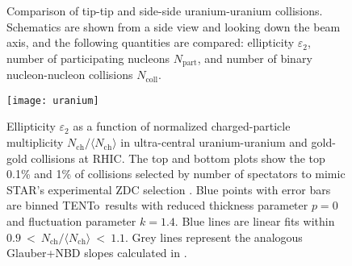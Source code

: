 \documentclass[aps,prc,reprint,amsmath,nofootinbib]{revtex4-1}
\newcommand{\trento}{T\raisebox{-.5ex}{R}ENTo}
\newcommand{\nch}{N_\text{ch}}
\begin{document}
\begin{figure}[b]
  \caption{
    \label{fig:uu-schematic}
    Comparison of tip-tip and side-side uranium-uranium collisions.
    Schematics are shown from a side view and looking down the beam axis, and the following quantities are compared:
    ellipticity $\varepsilon_2$, number of participating nucleons $N_\text{part}$, and number of binary nucleon-nucleon collisions $N_\text{coll}$.
  }
\end{figure}

\begin{figure}[b!]
  \centering
  \texttt{[image: uranium]}
  \caption{
    \label{fig:uranium}
    Ellipticity $\varepsilon_2$ as a function of normalized charged-particle multiplicity $\nch/\langle\nch\rangle$ in ultra-central uranium-uranium and gold-gold collisions at RHIC.
    The top and bottom plots show the top 0.1\% and 1\% of collisions selected by number of spectators to mimic STAR's experimental ZDC selection \cite{FortheSTAR:2013bza}.
    Blue points with error bars are binned \protect\trento\ results with reduced thickness parameter $p = 0$ and fluctuation parameter $k = 1.4$.
    Blue lines are linear fits within $0.9~<~\nch/\langle\nch\rangle~<~1.1$.
    Grey lines represent the analogous Glauber+NBD slopes calculated in \cite{FortheSTAR:2013bza}.
  }
\end{figure}
\end{document}
